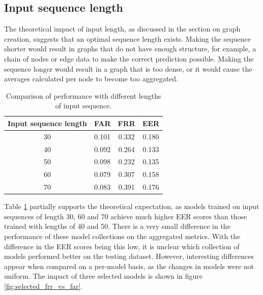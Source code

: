 \subsection{Input sequence length}
The theoretical impact of input length, as discussed in the section on graph creation, suggests that an optimal sequence length exists. Making the sequence shorter would result in graphs that do not have enough structure, for example, a chain of nodes or edge data to make the correct prediction possible. Making the sequence longer would result in a graph that is too dense, or it would cause the averages calculated per node to become too aggregated.


\begin{center}
	\begin{table}[H]
		\begin{center}
			\begin{tabular}{ |c|c|c|c| } 
				\hline
				Input sequence length & FAR & FRR & EER \\
				\hline
				30 & 0.101 & 0.332 & 0.180 \\
				\hline
				40 & 0.092 & 0.264 & 0.133 \\
				\hline
				50 & 0.098 & 0.232 & 0.135 \\
				\hline
				60 & 0.079 & 0.307 & 0.158 \\
				\hline
				70 & 0.083 & 0.391 & 0.176 \\
				\hline
			\end{tabular}
		\end{center}
		\caption{Comparison of performance with different lengths of input sequence.}
		\label{table:len_vs_perf}
	\end{table}
\end{center}


Table \ref{table:len_vs_perf} partially supports the theoretical expectation, as models trained on input sequences of length 30, 60 and 70 achieve much higher EER scores than those trained with lengths of 40 and 50. There is a very small difference in the performance of these model collections on the aggregated metrics. 
With the difference in the EER scores being this low, it is unclear which collection of models performed better on the testing dataset.
However, interesting differences appear when compared on a per-model basis, as the changes in models were not uniform. The impact of three selected models is shown in figure \ref{fig:selected_frr_vs_far}. 

